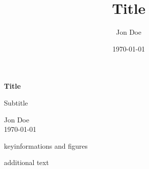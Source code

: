 
\begin{titlepage}
\title{Title}
\author{Jon Doe}
\date{\today}

\begin{center} 
\label{titelpage}
\vfill{}{\Huge \bf Title}

{\LARGE Subtitle}
		
Jon Doe \\ \today

\vfill{}{keyinformations and figures}

\vfill{}{additional text}
\end{center}
\end{titlepage}